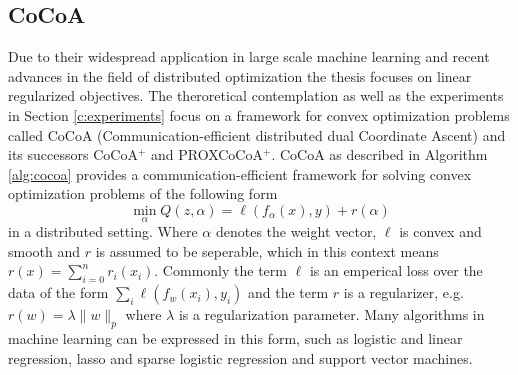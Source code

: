 \subsection{CoCoA}
Due to their widespread application in large scale machine learning and recent advances in the field of distributed optimization the thesis focuses on linear regularized objectives.
The theroretical contemplation as well as the experiments in Section \ref{c:experiments} focus on a framework for convex optimization problems called CoCoA (Communication-efficient distributed dual Coordinate Ascent) \cite{Jaggi2014} and its successors CoCoA$^+$\cite{smith2015l1} and PROXCoCoA$^+$\cite{smith2016cocoa}.
CoCoA as described in Algorithm \ref{alg:cocoa} provides a communication-efficient framework for solving convex optimization problems of the following form
\begin{equation}
\min_{\alpha} Q(z,\alpha) = \ell(f_\alpha(x),y) + r(\alpha)
\label{eqn:lin_loss}
\end{equation}
in a distributed setting.
Where $\alpha$ denotes the weight vector, $\ell$ is convex and smooth and $r$ is assumed to be seperable, which in this context means $r(x) = \sum_{i=0}^nr_i(x_i)$.
Commonly the term $\ell$ is an emperical loss over the data of the form $\sum_{i} \ell(f_w(x_i), y_i)$ and the term $r$ is a regularizer, e.g. $r(w) = \lambda\|w\|_p$ where $\lambda$ is a regularization parameter.
Many algorithms in machine learning can be expressed in this form, such as logistic and linear regression, lasso and sparse logistic regression and support vector machines.

